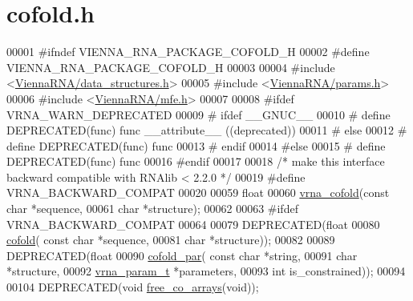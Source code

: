 \hypertarget{cofold_8h_source}{}\section{cofold.\+h}
\label{cofold_8h_source}

\begin{DoxyCode}
00001 \textcolor{preprocessor}{#ifndef VIENNA\_RNA\_PACKAGE\_COFOLD\_H}
00002 \textcolor{preprocessor}{#define VIENNA\_RNA\_PACKAGE\_COFOLD\_H}
00003 
00004 \textcolor{preprocessor}{#include <\hyperlink{data__structures_8h}{ViennaRNA/data\_structures.h}>}
00005 \textcolor{preprocessor}{#include <\hyperlink{params_8h}{ViennaRNA/params.h}>}
00006 \textcolor{preprocessor}{#include <\hyperlink{mfe_8h}{ViennaRNA/mfe.h}>}
00007 
00008 \textcolor{preprocessor}{#ifdef VRNA\_WARN\_DEPRECATED}
00009 \textcolor{preprocessor}{# ifdef \_\_GNUC\_\_}
00010 \textcolor{preprocessor}{#  define DEPRECATED(func) func \_\_attribute\_\_ ((deprecated))}
00011 \textcolor{preprocessor}{# else}
00012 \textcolor{preprocessor}{#  define DEPRECATED(func) func}
00013 \textcolor{preprocessor}{# endif}
00014 \textcolor{preprocessor}{#else}
00015 \textcolor{preprocessor}{# define DEPRECATED(func) func}
00016 \textcolor{preprocessor}{#endif}
00017 
00018 \textcolor{comment}{/* make this interface backward compatible with RNAlib < 2.2.0 */}
00019 \textcolor{preprocessor}{#define VRNA\_BACKWARD\_COMPAT}
00020 
00059 \textcolor{keywordtype}{float}
00060 \hyperlink{group__mfe__cofold_ga9ef3a297201dbf838a8daff2b45c0c82}{vrna\_cofold}(\textcolor{keyword}{const} \textcolor{keywordtype}{char} *sequence,
00061             \textcolor{keywordtype}{char} *structure);
00062 
00063 \textcolor{preprocessor}{#ifdef VRNA\_BACKWARD\_COMPAT}
00064 
00079 DEPRECATED(\textcolor{keywordtype}{float}
00080 \hyperlink{group__mfe__cofold_gabc8517f22cfe70595ee81fc837910d52}{cofold}( \textcolor{keyword}{const} \textcolor{keywordtype}{char} *sequence,
00081         \textcolor{keywordtype}{char} *structure));
00082 
00089 DEPRECATED(\textcolor{keywordtype}{float}
00090 \hyperlink{group__mfe__cofold_ga7612cfeeb1b793f1e4179b1eb53df1f3}{cofold\_par}( \textcolor{keyword}{const} \textcolor{keywordtype}{char} *\textcolor{keywordtype}{string},
00091             \textcolor{keywordtype}{char} *structure,
00092             \hyperlink{group__energy__parameters_structvrna__param__s}{vrna\_param\_t} *parameters,
00093             \textcolor{keywordtype}{int} is\_constrained));
00094 
00104 DEPRECATED(\textcolor{keywordtype}{void} \hyperlink{group__mfe__cofold_gaafb33d7473eb9af9d1b168ca8761c41a}{free\_co\_arrays}(\textcolor{keywordtype}{void}));

\end{DoxyCode}
